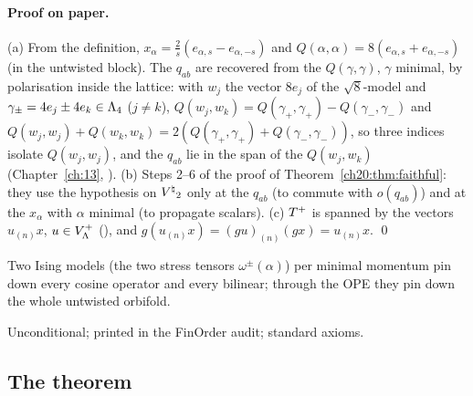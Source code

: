 \paragraph{Proof on paper.}  (a) From the definition,
$x_\alpha=\tfrac2s(e_{\alpha,s}-e_{\alpha,-s})$ and $Q(\alpha,\alpha)=8(e_{\alpha,s}+e_{\alpha,-s})$ (in the untwisted block).  The
$q_{ab}$ are recovered from the $Q(\gamma,\gamma)$, $\gamma$ minimal, by polarisation inside the lattice: with $w_j$ the vector
$8e_j$ of the $\sqrt8$-model and $\gamma_\pm=4e_j\pm4e_k\in{\Lambda}_4$ ($j\ne k$), $Q(w_j,w_k)=Q(\gamma_+,\gamma_+)-Q(\gamma_-,\gamma_-)$ and
$Q(w_j,w_j)+Q(w_k,w_k)=2(Q(\gamma_+,\gamma_+)+Q(\gamma_-,\gamma_-))$, so three indices isolate $Q(w_j,w_j)$, and the $q_{ab}$ lie in the
span of the $Q(w_j,w_k)$ (Chapter~\ref{ch:13}, ).  (b) Steps 2--6 of the proof of
Theorem~\ref{ch20:thm:faithful}: they use the hypothesis on ${V^{\natural}}_2$ only at the $q_{ab}$ (to commute with $o(q_{ab})$)
and at the $x_\alpha$ with $\alpha$ minimal (to propagate scalars).  (c) $T^{+}$ is spanned by the vectors
$u_{(n)}x$, $u\in V_{\Lambda}^{+}$ (), and $g(u_{(n)}x)=(gu)_{(n)}(gx)=u_{(n)}x$. \qed
\begin{physics}
Two Ising models (the two stress tensors $\omega^\pm(\alpha)$) per minimal momentum pin down every cosine operator and every
bilinear; through the OPE they pin down the whole untwisted orbifold.
\end{physics}
\begin{status}
Unconditional; printed in the FinOrder audit; standard axioms.
\end{status}

\subsection{The theorem}

